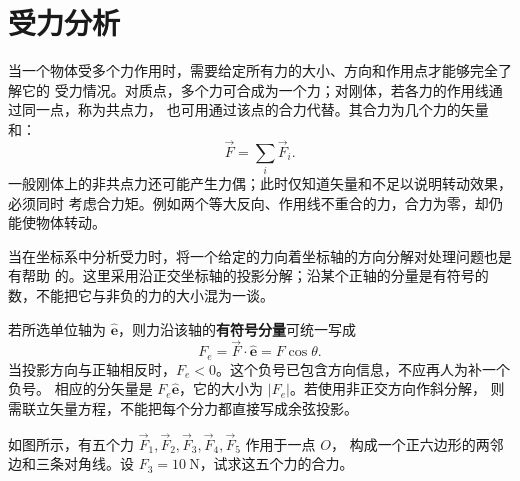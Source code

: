 {
\graphicspath{{../../../sample/xes-original/second-section/}}
\section{受力分析}
当一个物体受多个力作用时，需要给定所有力的大小、方向和作用点才能够完全了解它的
受力情况。对质点，多个力可合成为一个力；对刚体，若各力的作用线通过同一点，称为共点力，
也可用通过该点的合力代替。其合力为几个力的矢量和：
\begin{equation}
  \vec{F}=\sum_i\vec{F}_i.
\end{equation}
一般刚体上的非共点力还可能产生力偶；此时仅知道矢量和不足以说明转动效果，必须同时
考虑合力矩。例如两个等大反向、作用线不重合的力，合力为零，却仍能使物体转动。

当在坐标系中分析受力时，将一个给定的力向着坐标轴的方向分解对处理问题也是有帮助
的。这里采用沿正交坐标轴的投影分解；沿某个正轴的分量是有符号的数，不能把它与非负的力的大小混为一谈。

若所选单位轴为 $\hat{\boldsymbol e}$，则力沿该轴的\textbf{有符号分量}可统一写成
\[
  F_e=\vec F\cdot\hat{\boldsymbol e}=F\cos\theta.
\]
当投影方向与正轴相反时，$F_e<0$。这个负号已包含方向信息，不应再人为补一个负号。
相应的分矢量是 $F_e\hat{\boldsymbol e}$，它的大小为 $|F_e|$。若使用非正交方向作斜分解，
则需联立矢量方程，不能把每个分力都直接写成余弦投影。

\begin{origexamplebox}{}\label{ch05:ex:s02-1-8}
如图所示，有五个力 $\vec{F}_1,\vec{F}_2,\vec{F}_3,\vec{F}_4,\vec{F}_5$ 作用于一点 $O$，
构成一个正六边形的两邻边和三条对角线。设 $F_3=\SI{10}{\newton}$，试求这五个力的合力。

\begin{center}
\end{center}
\end{origexamplebox}

}
